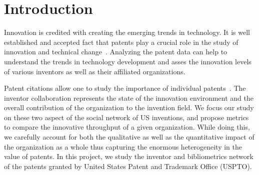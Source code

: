 \section{Introduction} 
% 
Innovation is credited with creating the emerging trends in technology. It is
well established and accepted fact that patents play a crucial role in the
study of innovation and technical change~\cite{narin1987patents}. Analyzing
the patent data can help to understand the trends in technology development
and asses the innovation levels of various inventors as well as their
affiliated organizations.

Patent citations allow one to study the importance of individual
patents~\cite{albert1991direct}. The inventor collaboration represents the
state of the innovation environment and the overall contribution of the
organization to the invention field. We focus our study on these two aspect of
the social network of US inventions, and propose metrics to compare the
innovative throughput of a given organization. While doing this, we carefully
account for both the qualitative as well as the quantitative impact of the
organization as a whole thus capturing the enormous heterogeneity in the value
of patents. In this project, we study the inventor and bibliometrics network
of the patents granted by United States Patent and Trademark Office (USPTO).